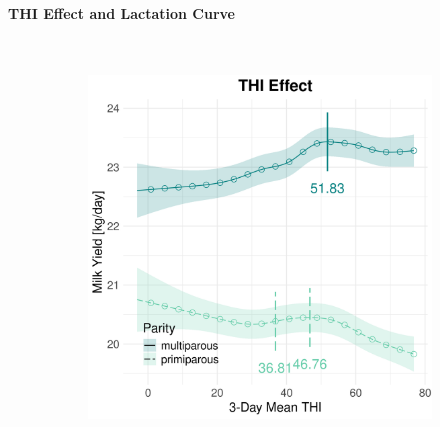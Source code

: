 \newpage
\paragraph{THI Effect and Lactation Curve} \quad \\
\begin{figure}[H]
    \centering
    \begin{subfigure}[b]{0.45\textwidth}
        \centering
        \includegraphics[width=\textwidth]{thesis/figures/models/milk/after2010/bs_milk_after2010/bs_milk_after2010_marginal_thi_milk_combined.png}
    \end{subfigure}
    \hspace{0.05\textwidth} %
    \begin{subfigure}[b]{0.45\textwidth}
        \centering

\end{subfigure}
\end{figure}
